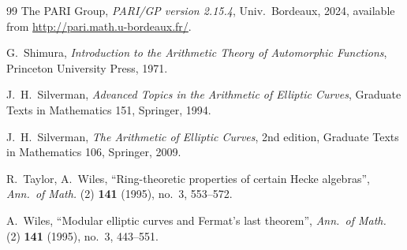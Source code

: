 \documentclass[11pt]{amsart}
\theoremstyle{definition}
\theoremstyle{remark}
\begin{document}
\begin{thebibliography}{99}
The PARI Group,
\emph{PARI/GP version 2.15.4},
Univ.\ Bordeaux, 2024,
available from \url{http://pari.math.u-bordeaux.fr/}.

G.~Shimura, \emph{Introduction to the Arithmetic Theory of
Automorphic Functions}, Princeton University Press, 1971.

J.~H.~Silverman,
\emph{Advanced Topics in the Arithmetic of Elliptic Curves},
Graduate Texts in Mathematics 151, Springer, 1994.

J.~H.~Silverman,
\emph{The Arithmetic of Elliptic Curves},
2nd edition, Graduate Texts in Mathematics 106, Springer, 2009.

R.~Taylor, A.~Wiles,
``Ring-theoretic properties of certain Hecke algebras'',
\emph{Ann.\ of Math.} (2) \textbf{141} (1995), no.~3, 553--572.

A.~Wiles,
``Modular elliptic curves and Fermat's last theorem'',
\emph{Ann.\ of Math.} (2) \textbf{141} (1995), no.~3, 443--551.

\end{thebibliography}
\end{document}

